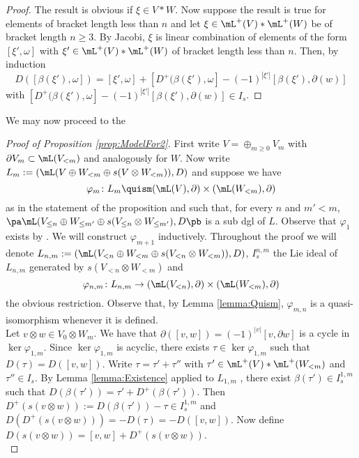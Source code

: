 \begin{proof}
	The result is obvious if $\xi\in V*W$. Now suppose the result is true for elements of bracket length less than $n$ and let $\xi\in \mL^+(V)*\mL^+(W)$ be of bracket length $n\ge 3$. By Jacobi, $\xi$ is linear combination of elements of the form $[\xi',\omega]$ with $\xi'\in \mL^+(V)*\mL^+(W)$ of bracket length less than $n$. Then, by induction \[D([\beta(\xi'),\omega])=[\xi',\omega]+[D^+(\beta(\xi'),\omega]-(-1)^{|\xi'|}[\beta(\xi'),\partial(w)]\] with $[D^+(\beta(\xi'),\omega]-(-1)^{|\xi'|}[\beta(\xi'),\partial(w)]\in I_s$.
\end{proof}

We may now proceed to the 

\begin{proof}[Proof of Proposition \ref{prop:ModelFor2}]
First write $V=\oplus_{m\ge 0}V_m$ with $\partial V_m\subset \mL (V_{<m})$ and analogously for $W$. Now write  $L_m:=\left(\mL (V\oplus W_{<m}\oplus s(V\otimes W_{<m})), D\right)$ and suppose we have \[\varphi_m\colon L_m\quism (\mL (V),\partial)\times (\mL (W_{<m}),\partial)\] as in the statement of the proposition and such that, for every $n$ and $m'<m$, $\pa\mL (V_{\le n}\oplus W_{\le m'}\oplus s(V_{\le n}\otimes W_{\le m'}),D\pb$ is a sub dgl of $L$. Observe that $\varphi_1$ exists by \cite[Section 3]{Lupton-Smith}. We will construct $\varphi_{m+1}$ inductively. Throughout the proof we will denote $L_{n,m}:=\left(\mL (V_{<n}\oplus W_{<m}\oplus s(V_{<n}\otimes W_{<m})), D\right)$, $I_s^{n,m}$ the Lie ideal of $L_{n,m}$ generated by $s(V_{<n}\otimes W_{<m})$ and \[\varphi_{n,m}\colon L_{n,m}\to (\mL (V_{<n}),\partial)\times (\mL (W_{<m}),\partial)\] the obvious restriction.  Observe that, by Lemma \ref{lemma:Quism}, $\varphi_{m,n}$ is a quasi-isomorphism whenever it is defined.\\

Let $v\otimes w\in V_0\otimes W_m$. We have that $\partial([v,w])=(-1)^{|v|}[v,\partial w]$ is a cycle in $\ker\varphi_{1,m}$. Since $\ker\varphi_{1,m}$ is acyclic, there exists $\tau\in \ker\varphi_{1,m}$ such that $D(\tau)=D([v,w])$. Write $\tau=\tau'+\tau''$ with $\tau'\in \mL^+(V)*\mL^+(W_{<m})$ and $\tau''\in I_s$. By Lemma \ref{lemma:Existence} applied to $L_{1,m}$ , there exist $\beta(\tau')\in I_s^{1,m}$ such that $D(\beta(\tau'))=\tau'+D^+(\beta(\tau'))$. Then $D^+(s(v\otimes w)):=D(\beta(\tau'))-\tau\in I_s^{1,m}$ and $D(D^+(s(v\otimes w)))=-D(\tau)=-D([v,w])$. Now define $D(s(v\otimes w))=[v,w]+ D^+(s(v\otimes w))$.\\


\end{proof}
